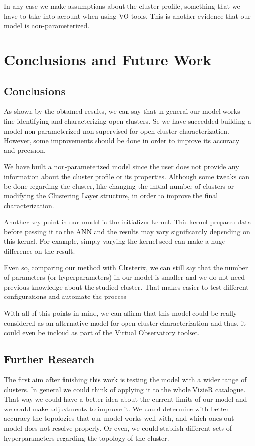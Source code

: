 \documentclass[11pt, a4paper, english]{book}
\begin{document}
In any case we make assumptions about the cluster profile, something that we have to take into account when using VO tools.
This is another evidence that our model is non-parameterized.

\chapter{Conclusions and Future Work}

\section{Conclusions}

As shown by the obtained results, we can say that in general our model works fine identifying and characterizing open clusters.
So we have succedded building a model non-parameterized non-supervised for open cluster characterization.
However, some improvements should be done in order to improve its accuracy and precision.

We have built a non-parameterized model since the user does not provide any information about the cluster profile or its properties.
Although some tweaks can be done regarding the cluster, like changing the initial number of clusters or modifying the Clustering Layer structure,
in order to improve the final characterization.

Another key point in our model is the initializer kernel.
This kernel prepares data before passing it to the ANN and the results may vary significantly depending on this kernel.
For example, simply varying the kernel seed can make a huge difference on the result.

Even so, comparing our method with Clusterix, we can still say that the number of parameters (or hyperparameters) in our model is smaller
and we do not need previous knowledge about the studied cluster.
That makes easier to test different configurations and automate the process.

With all of this points in mind, we can affirm that this model could be really considered as an alternative model for open cluster characterization and thus,
it could even be incloud as part of the Virtual Observatory toolset.

\section{Further Research}

The first aim after finishing this work is testing the model with a wider range of clusters.
In general we could think of applying it to the whole VizieR catalogue.
That way we could have a better idea about the current limits of our model and we could make adjustments to improve it.
We could determine with better accuracy the topologies that our model works well with, and which ones out model does not resolve properly.
Or even, we could stablish different sets of hyperparameters regarding the topology of the cluster.
\end{document}
